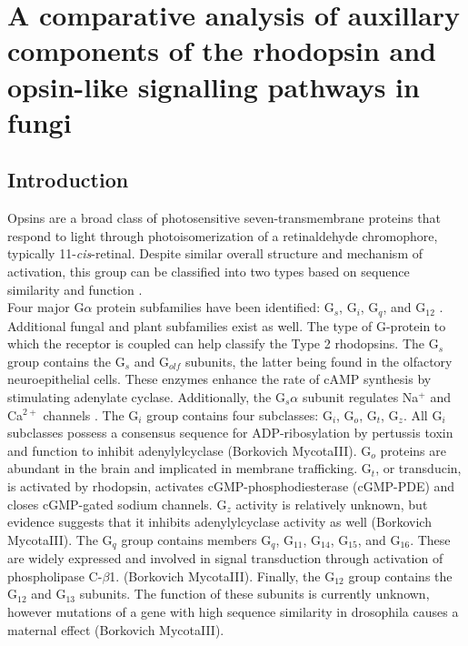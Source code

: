 \chapter{A comparative analysis of auxillary components of the rhodopsin and opsin-like signalling pathways in fungi}
\label{chap:RhodAux}
\section{Introduction}
\indent Opsins are a broad class of photosensitive seven-transmembrane proteins that respond to light through photoisomerization of a retinaldehyde chromophore, typically 11-\textit{cis}-retinal. Despite similar overall structure and mechanism of activation, this group can be classified into two types based on sequence similarity and function \cite{Spudich2000}.\\
\indent Four major G$\alpha$ protein subfamilies have been identified: G$_{s}$, G$_{i}$, G$_{q}$, and G$_{12}$ \cite{Hepler1992}. Additional fungal \cite{Bolker1998} and plant \cite{Ma1994} subfamilies exist as well. The type of G-protein to which the receptor is coupled can help classify the Type 2 rhodopsins. The G$_{s}$ group contains the G$_{s}$ and G$_{olf}$  subunits, the latter being found in the olfactory neuroepithelial cells. These enzymes enhance the rate of cAMP synthesis by stimulating adenylate cyclase. Additionally, the G$_{s}\alpha$ subunit regulates Na$^{+}$ and Ca$^{2+}$ channels \cite{Hepler1992}. The G$_{i}$ group contains four subclasses: G$_{i}$, G$_{o}$, G$_{t}$, G$_{z}$. All G$_{i}$ subclasses possess a consensus sequence for ADP-ribosylation by pertussis toxin and function to inhibit adenylylcyclase (Borkovich MycotaIII). G$_{o}$ proteins are abundant in the brain and implicated in membrane trafficking. G$_{t}$, or transducin, is activated by rhodopsin, activates cGMP-phosphodiesterase (cGMP-PDE) and closes cGMP-gated sodium channels. G$_{z}$ activity is relatively unknown, but evidence suggests that it inhibits adenylylcyclase activity as well (Borkovich MycotaIII). The G$_{q}$ group contains members G$_{q}$, G$_{11}$, G$_{14}$, G$_{15}$, and G$_{16}$. These are widely expressed and involved in signal transduction through activation of phospholipase C-$\beta$1. (Borkovich MycotaIII). Finally, the G$_{12}$ group contains the G$_{12}$ and G$_{13}$ subunits. The function of these subunits is currently unknown, however mutations of a gene with high sequence similarity in drosophila causes a maternal effect (Borkovich MycotaIII).\\
